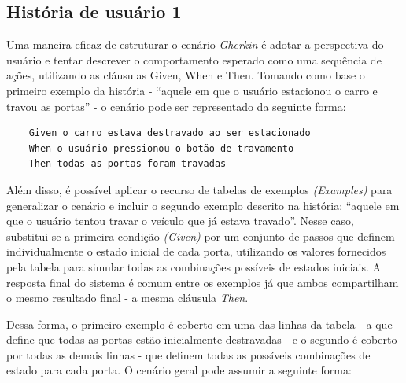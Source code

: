 \subsection{História de usuário 1}

Uma maneira eficaz de estruturar o cenário \textit{Gherkin} é adotar a perspectiva do usuário e tentar descrever o comportamento esperado como uma sequência de ações, 
utilizando as cláusulas Given, When e Then. Tomando como base o primeiro exemplo da história - ``aquele em que o usuário estacionou o carro e travou as portas'' - 
o cenário pode ser representado da seguinte forma:

\begin{verbatim}
    Given o carro estava destravado ao ser estacionado
    When o usuário pressionou o botão de travamento
    Then todas as portas foram travadas
\end{verbatim}


Além disso, é possível aplicar o recurso de tabelas de exemplos \textit{(Examples)} para generalizar o cenário e incluir o segundo exemplo descrito na história: ``aquele 
em que o usuário tentou travar o veículo que já estava travado''. Nesse caso, substitui-se a primeira condição \textit{(Given)} por um conjunto de passos que definem 
individualmente o estado inicial de cada porta, utilizando os valores fornecidos pela tabela para simular todas as combinações possíveis de estados iniciais. 
A resposta final do sistema é comum entre os exemplos já que ambos compartilham o mesmo resultado final - a mesma cláusula \textit{Then}. 

Dessa forma, o primeiro exemplo é coberto em uma das linhas da tabela - a que define que todas as portas estão inicialmente destravadas - e o segundo é coberto 
por todas as demais linhas - que definem todas as possíveis combinações de estado para cada porta. O cenário geral pode assumir a seguinte forma:



